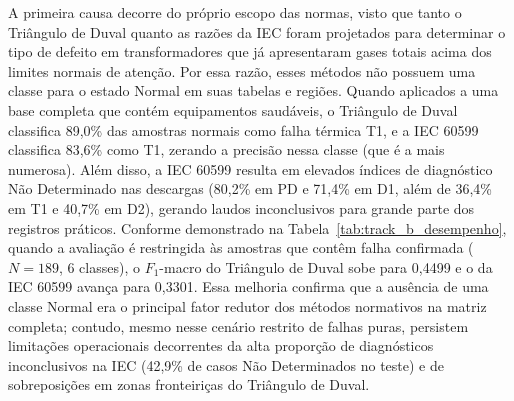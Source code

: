 \begin{table}[H]
\centering
\caption{Concordância entre os rótulos da base e os diagnósticos da IEC 60599 e do Triângulo de Duval.}
\label{tab:auditoria_normativa}
\end{table}

A primeira causa decorre do próprio escopo das normas, visto que tanto o Triângulo de Duval quanto as razões da IEC foram projetados para determinar o tipo de defeito em transformadores que já apresentaram gases totais acima dos limites normais de atenção. Por essa razão, esses métodos não possuem uma classe para o estado Normal em suas tabelas e regiões. Quando aplicados a uma base completa que contém equipamentos saudáveis, o Triângulo de Duval classifica 89,0\% das amostras normais como falha térmica T1, e a IEC 60599 classifica 83,6\% como T1, zerando a precisão nessa classe (que é a mais numerosa). Além disso, a IEC 60599 resulta em elevados índices de diagnóstico Não Determinado nas descargas (80,2\% em PD e 71,4\% em D1, além de 36,4\% em T1 e 40,7\% em D2), gerando laudos inconclusivos para grande parte dos registros práticos. Conforme demonstrado na Tabela~\ref{tab:track_b_desempenho}, quando a avaliação é restringida às amostras que contêm falha confirmada ($N=189$, 6 classes), o $F_1$-macro do Triângulo de Duval sobe para 0,4499 e o da IEC 60599 avança para 0,3301. Essa melhoria confirma que a ausência de uma classe Normal era o principal fator redutor dos métodos normativos na matriz completa; contudo, mesmo nesse cenário restrito de falhas puras, persistem limitações operacionais decorrentes da alta proporção de diagnósticos inconclusivos na IEC (42,9\% de casos Não Determinados no teste) e de sobreposições em zonas fronteiriças do Triângulo de Duval.

